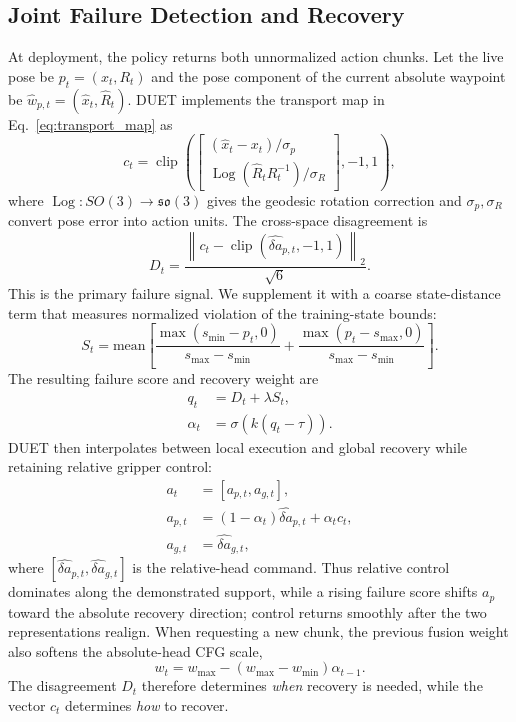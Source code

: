 \documentclass[letterpaper, 10 pt, conference]{ieeeconf}
\begin{document}
\subsection{Joint Failure Detection and Recovery}
At deployment, the policy returns both unnormalized action chunks. Let the live pose be $p_t=(x_t,R_t)$ and the pose component of the current absolute waypoint be $\hat{w}_{p,t}=(\hat{x}_t,\hat{R}_t)$. DUET implements the transport map in Eq.~\eqref{eq:transport_map} as
\begin{equation}
    c_t=\operatorname{clip}\!\left(
    \begin{bmatrix}
    (\hat{x}_t-x_t)/\sigma_p \\
    \operatorname{Log}(\hat{R}_tR_t^{-1})/\sigma_R
    \end{bmatrix},-1,1\right),
    \label{eq:recovery_vector}
\end{equation}
where $\operatorname{Log}:SO(3)\rightarrow\mathfrak{so}(3)$ gives the geodesic rotation correction and $\sigma_p,\sigma_R$ convert pose error into action units. The cross-space disagreement is
\begin{equation}
    D_t=\frac{\left\|c_t-
    \operatorname{clip}(\hat{\delta a}_{p,t},-1,1)\right\|_2}{\sqrt{6}}.
    \label{eq:disagreement}
\end{equation}
This is the primary failure signal. We supplement it with a coarse state-distance term that measures normalized violation of the training-state bounds:
\begin{equation}
    S_t =
    \mathrm{mean}\left[
    \frac{\max(s_{\min} - p_t, 0)}{s_{\max}-s_{\min}}
    +
    \frac{\max(p_t - s_{\max}, 0)}{s_{\max}-s_{\min}}
    \right].
\end{equation}
The resulting failure score and recovery weight are
\begin{align}
    q_t &= D_t + \lambda S_t, \\
    \alpha_t &= \sigma(k(q_t-\tau)).
\end{align}
DUET then interpolates between local execution and global recovery while retaining relative gripper control:
\begin{align}
    a_t &= [a_{p,t},a_{g,t}], \\
    a_{p,t} &= (1-\alpha_t)\hat{\delta a}_{p,t} + \alpha_t c_t, \\
    a_{g,t} &= \hat{\delta a}_{g,t},
    \label{eq:fused_action}
\end{align}
where $[\hat{\delta a}_{p,t},\hat{\delta a}_{g,t}]$ is the relative-head command. Thus relative control dominates along the demonstrated support, while a rising failure score shifts $a_p$ toward the absolute recovery direction; control returns smoothly after the two representations realign. When requesting a new chunk, the previous fusion weight also softens the absolute-head CFG scale,
\begin{equation}
    w_t = w_{\max} - (w_{\max}-w_{\min})\alpha_{t-1}.
\end{equation}
The disagreement $D_t$ therefore determines \emph{when} recovery is needed, while the vector $c_t$ determines \emph{how} to recover.
\end{document}
